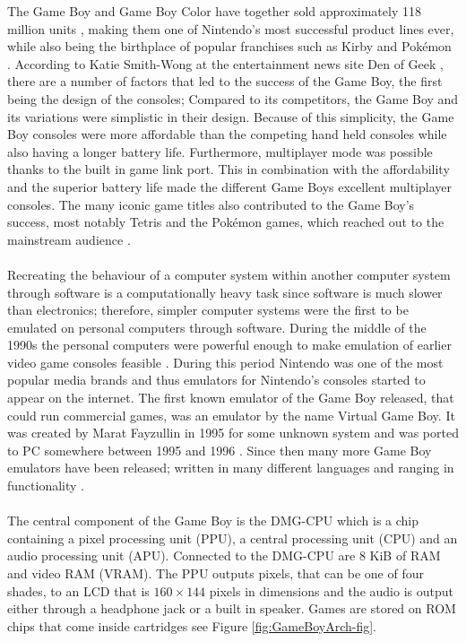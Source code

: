 The Game Boy and Game Boy Color have together sold approximately 118 million units \cite{GBSales}, making them one of Nintendo's most successful product lines ever, while also being the birthplace of popular franchises such as Kirby and Pokémon \cite{Kirby} \cite{Pokemon} \cite{gameboytimeline2}. According to Katie Smith-Wong at the entertainment news site Den of Geek \cite{gameboylook}, there are a number of factors that led to the success of the Game Boy, the first being the design of the consoles; Compared to its competitors, the Game Boy and its variations were simplistic in their design. Because of this simplicity, the Game Boy consoles were more affordable than the competing hand held consoles while also having a longer battery life. Furthermore, multiplayer mode was possible thanks to the built in game link port. This in combination with the affordability and the superior battery life made the different Game Boys excellent multiplayer consoles. The many iconic game titles also contributed to the Game Boy's success, most notably Tetris \cite{Tetris} and the Pokémon \cite{Pokemon} games, which reached out to the mainstream audience .\\
\\
Recreating the behaviour of a computer system within another computer system through software is a computationally heavy task since software is much slower than electronics; therefore, simpler computer systems were the first to be emulated on personal computers through software. During the middle of the 1990s the personal computers were powerful enough to make emulation of earlier video game consoles feasible \cite{emunation-history}. During this period Nintendo was one of the most popular media brands \cite{ask-wonder-nintendo} and thus emulators for Nintendo's consoles started to appear on the internet. The first known emulator of the Game Boy released, that could run commercial games, was an emulator by the name Virtual Game Boy. It was created by Marat Fayzullin in 1995 for some unknown system and was ported to PC somewhere between 1995 and 1996 \cite{gameboyemulationhistory}. Since then many more Game Boy emulators have been released; written in many different languages and ranging in functionality \cite{gameboyemulators}.\\
\\
The central component of the Game Boy is the DMG-CPU \cite{gameboyarchitecture} which is a chip containing a pixel processing unit (PPU), a central processing unit (CPU) and an audio processing unit (APU). Connected to the DMG-CPU are 8 KiB of RAM and video RAM (VRAM). The PPU outputs pixels, that can be one of four shades, to an LCD that is $160 \times 144$ pixels in dimensions and the audio is output either through a headphone jack or a built in speaker. Games are stored on ROM chips that come inside cartridges see Figure \ref{fig:GameBoyArch-fig}.

